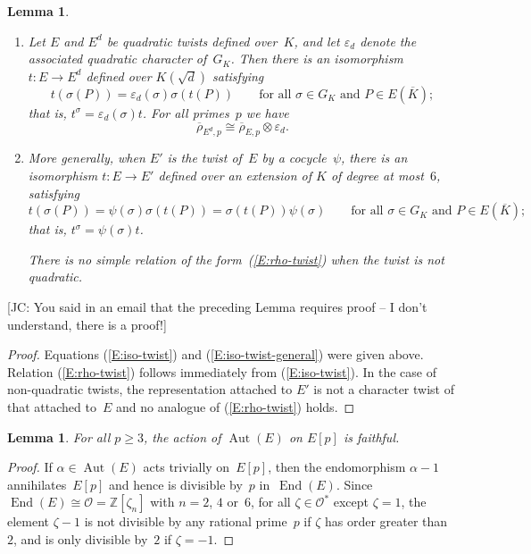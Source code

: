 \documentclass[12pt, reqno]{amsart}
\newcommand{\Z}{\mathbb{Z}}
\newcommand{\Kbar}{{\overline{K}}}
\newcommand{\rhobar}{{\overline{\rho}}}
\newcommand{\eps}{\varepsilon}
\newcommand{\calO}{\mathcal{O}}
\DeclareMathOperator{\Aut}{Aut}
\DeclareMathOperator{\End}{End}
\numberwithin{equation}{section}
\newtheorem{lemma}[theorem]{Lemma}
\theoremstyle{definition}
\theoremstyle{remark}
\newcommand{\jc}[1]{{\color{darkgreen} \textsf{[JC: #1]}}}
\begin{document}
\begin{lemma}\label{L:twist-rep}
  \begin{enumerate}
    \item
  Let $E$ and $E^d$ be quadratic twists defined over~$K$, and let
  $\eps_d$ denote the associated quadratic character of~$G_K$.  Then
  there is an isomorphism $t :E\to E^d$ defined over $K(\sqrt{d})$
  satisfying
\begin{equation}\label{E:iso-twist}
t (\sigma(P)) = \eps_d(\sigma)\sigma(t (P))\qquad\text{for
  all~$\sigma\in G_K$ and $P\in E(\Kbar)$};
\end{equation}
that is, $t ^{\sigma} = \eps_d(\sigma)t $.  For all primes~$p$ we have
\begin{equation} \label{E:rho-twist}
  \rhobar_{E^d,p} \cong \rhobar_{E,p}\otimes\eps_d.
\end{equation}
\item More generally, when $E'$ is the twist of~$E$ by a
  cocycle~$\psi$, there is an isomorphism $t :E\to E'$ defined
  over an extension of $K$ of degree at most~$6$, satisfying
  \begin{equation}\label{E:iso-twist-general}
t (\sigma(P)) = \psi(\sigma)\sigma(t (P)) =
\sigma(t (P))\psi(\sigma)\qquad\text{for all~$\sigma\in G_K$ and
  $P\in E(\Kbar)$};
  \end{equation}
  that is, $t ^{\sigma} = \psi(\sigma)t $.

  There is no simple relation of the form~(\ref{E:rho-twist}) when the
twist is not quadratic.
  \end{enumerate}

\end{lemma}

\jc{You said in an email that the preceding Lemma requires proof -- I
  don't understand, there is a proof!}

\begin{proof}
Equations (\ref{E:iso-twist}) and (\ref{E:iso-twist-general}) were
given above.  Relation (\ref{E:rho-twist}) follows immediately from
(\ref{E:iso-twist}).  In the case of non-quadratic twists, the
representation attached to $E'$ is not a character twist of that
attached to~$E$ and no analogue of (\ref{E:rho-twist}) holds.
\end{proof}

\begin{lemma} \label{L:faithful}
  For all $p\ge3$, the action of $\Aut(E)$ on $E[p]$ is faithful.
\end{lemma}
\begin{proof}
If $\alpha\in\Aut(E)$ acts trivially on~$E[p]$, then the endomorphism
$\alpha-1$ annihilates~$E[p]$ and hence is divisible by~$p$
in~$\End(E)$.  Since $\End(E)\cong\calO=\Z[\zeta_n]$ with $n=2$, $4$
or~$6$, for all $\zeta\in \calO^*$ except $\zeta=1$, the element
$\zeta-1$ is not divisible by any rational prime~$p$ if $\zeta$
has order greater than~$2$, and is only divisible by~$2$ if
$\zeta=-1$.
\end{proof}
\end{document}
